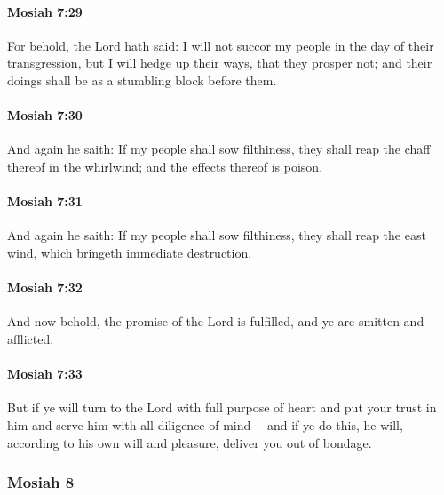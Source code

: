 		\paragraph{Mosiah 7:29} %
			\label{MOSIAH-7-29}

			For behold, the Lord hath said:
			I will not succor my people in the day of their transgression,
			but I will hedge up their ways, that they prosper not;
			and their doings shall be as a stumbling block before them.

		\paragraph{Mosiah 7:30} %
			\label{MOSIAH-7-30}

			And again he saith:
			If my people shall sow filthiness,
			they shall reap the chaff thereof in the whirlwind;
			and the effects thereof is poison.

		\paragraph{Mosiah 7:31} %
			\label{MOSIAH-7-31}

			And again he saith:
			If my people shall sow filthiness,
			they shall reap the east wind, which bringeth immediate destruction.

		\paragraph{Mosiah 7:32} %
			\label{MOSIAH-7-32}

			And now behold, the promise of the Lord is fulfilled,
			and ye are smitten and afflicted.

		\paragraph{Mosiah 7:33} %
			\label{MOSIAH-7-33}

			But if ye will turn to the Lord with full purpose of heart
			and put your trust in him and serve him with all diligence of mind---
			and if ye do this,
			he will, according to his own will and pleasure, deliver you out of bondage.

	\subsubsection{Mosiah 8} %
		\label{MOSIAH-8}
		
